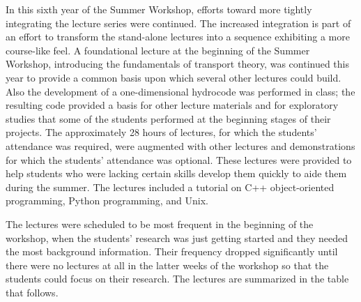 In this sixth year of the Summer Workshop, efforts
toward more tightly integrating the lecture series were continued.
The increased integration is part of an effort to transform the
stand-alone lectures into a sequence exhibiting a more course-like
feel.  A foundational lecture at the beginning of the Summer Workshop,
introducing the fundamentals of transport theory, was continued this
year to provide a common basis upon which several other lectures could
build.  Also the development of a one-dimensional hydrocode was
performed in class; the resulting code provided a basis for other
lecture materials and for exploratory studies that some of the
students performed at the beginning stages of their projects.  The
approximately 28 hours of lectures, for which the students' attendance
was required, were augmented with other lectures and demonstrations
for which the students' attendance was optional.  These lectures were
provided to help students who were lacking certain skills develop them
quickly to aide them during the summer.  The lectures included a
tutorial on C++ object-oriented programming, Python programming, and
Unix.

The lectures were scheduled to be most frequent in the beginning of
the workshop, when the students' research was just getting started and
they needed the most background information. Their frequency dropped
significantly until there were no lectures at all in the latter weeks
of the workshop so that the students could focus on their research.
The lectures are summarized in the table that follows.

